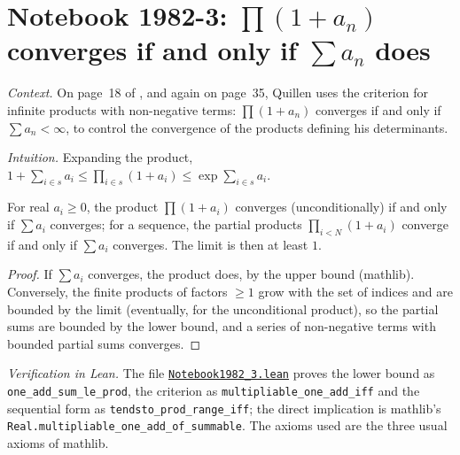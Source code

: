 \section[Notebook 1982-3: products $\prod(1 + a_n)$]{Notebook 1982-3: $\prod(1 + a_n)$ converges if and only if $\sum a_n$ does\protect{}}\label{sec:quillen-1982-3}

\emph{Context.} On page~18 of , and again on page~35, Quillen uses the criterion for infinite products with non-negative terms: $\prod(1 + a_n)$ converges if and only if $\sum a_n < \infty$, to control the convergence of the products defining his determinants.

\emph{Intuition.} Expanding the product, $1 + \sum_{i \in s} a_i \le \prod_{i \in s}(1 + a_i) \le \exp\sum_{i \in s} a_i$.

\begin{encadre}
\begin{theoreme}[Notebook 1982-3, p.~18]\label{thm:quillen-1982-3}
For real $a_i \ge 0$, the product $\prod(1 + a_i)$ converges (unconditionally) if and only if $\sum a_i$ converges; for a sequence, the partial products $\prod_{i<N}(1 + a_i)$ converge if and only if $\sum a_i$ converges. The limit is then at least $1$.
\end{theoreme}
\end{encadre}

\begin{proof}
If $\sum a_i$ converges, the product does, by the upper bound (mathlib). Conversely, the finite products of factors $\ge 1$ grow with the set of indices and are bounded by the limit (eventually, for the unconditional product), so the partial sums are bounded by the lower bound, and a series of non-negative terms with bounded partial sums converges.
\end{proof}

\emph{Verification in Lean.} The file \href{\leanblobmain/Notebook1982_3.lean}{\texttt{Notebook1982\_3.\allowbreak{}lean}} proves the lower bound as \texttt{one\_add\_sum\_le\_prod}, the criterion as \texttt{multipliable\_one\_add\_iff} and the sequential form as \texttt{tendsto\_prod\_range\_iff}; the direct implication is mathlib's \texttt{Real.multipliable\_one\_add\_of\_summable}. The axioms used are the three usual axioms of mathlib.

